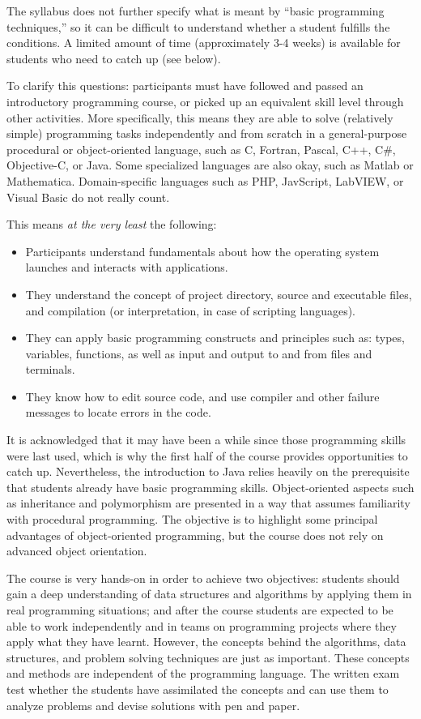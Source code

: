 \documentclass[a4paper,twoculumn,10pt]{article}
\begin{document}
The syllabus does not further specify what is meant by ``basic programming techniques,'' so it can be difficult to understand whether a student fulfills the conditions.
A limited amount of time (approximately 3-4 weeks) is available for students who need to catch up (see below).

To clarify this questions: participants must have followed and passed an introductory programming course, or picked up an equivalent skill level through other activities.
More specifically, this means they are able to solve (relatively simple) programming tasks independently and from scratch in a general-purpose procedural or object-oriented language, such as C, Fortran, Pascal, C++, C\#, Objective-C, or Java.
Some specialized languages are also okay, such as Matlab or Mathematica.
Domain-specific languages such as PHP, JavScript, LabVIEW, or Visual Basic do not really count.

This means \emph{at the very least} the following:

\begin{itemize}
\item Participants understand fundamentals about how the operating system launches and interacts with applications.
\item They understand the concept of project directory, source and executable files, and compilation (or interpretation, in case of scripting languages).
\item They can apply basic programming constructs and principles such as: types, variables, functions, as well as input and output to and from files and terminals.
\item They know how to edit source code, and use compiler and other failure messages to locate errors in the code.
\end{itemize}

It is acknowledged that it may have been a while since those programming skills were last used, which is why the first half of the course provides opportunities to catch up.
Nevertheless, the introduction to Java relies heavily on the prerequisite that students already have basic programming skills.
Object-oriented aspects such as inheritance and polymorphism are presented in a way that assumes familiarity with procedural programming.
The objective is to highlight some principal advantages of object-oriented programming, but the course does not rely on advanced object orientation.

The course is very hands-on in order to achieve two objectives:
students should gain a deep understanding of data structures and algorithms by applying them in real programming situations;
and after the course students are expected to be able to work independently and in teams on programming projects where they apply what they have learnt.
However, the concepts behind the algorithms, data structures, and problem solving techniques are just as important.
These concepts and methods are independent of the programming language.
The written exam test whether the students have assimilated the concepts and can use them to analyze problems and devise solutions with pen and paper.
\end{document}
